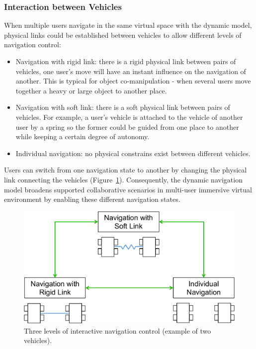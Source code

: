 \subsubsection{Interaction between Vehicles}
When multiple users navigate in the same virtual space with the dynamic model, physical links could be established between vehicles to allow different levels of navigation control:     

\begin{itemize}
\item Navigation with rigid link: there is a rigid physical link between pairs of vehicles, one user's move will have an instant influence on the navigation of another. This is typical for object co-manipulation - when several users move together a heavy or large object to another place.
\item Navigation with soft link: there is a soft physical link between pairs of vehicles. For example, a user's vehicle is attached to the vehicle of another user by a spring so the former could be guided from one place to another while keeping a certain degree of autonomy.
\item Individual navigation: no physical constrains exist between different vehicles.
\end{itemize}

Users can switch from one navigation state to another by changing the physical link connecting the vehicles (Figure~\ref{fig:5_user_inter}). Consequently, the dynamic navigation model broadens supported collaborative scenarios in multi-user immersive virtual environment by enabling these different navigation states.

\begin{figure}[htb]
  \centering
  \includegraphics[width=.8\textwidth]{figures/ch5/user_inter}
  \caption{\label{fig:5_user_inter}Three levels of interactive navigation control (example of two vehicles).}
\end{figure}


